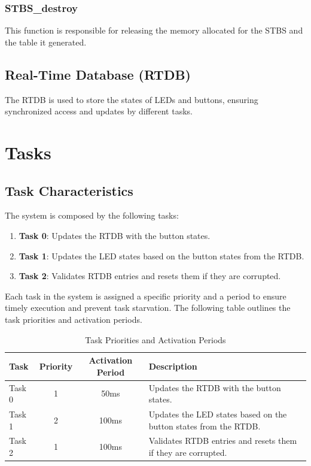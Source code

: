 \documentclass[a4paper,12pt]{article}
\begin{document}
\subsubsection{STBS\_destroy}
This function is responsible for releasing the memory allocated for the STBS and the table it generated.

\subsection{Real-Time Database (RTDB)}
The RTDB is used to store the states of LEDs and buttons, ensuring synchronized access and updates by different tasks.

\section{Tasks}
\subsection{Task Characteristics}
The system is composed by the following tasks:
\begin{enumerate}
    \item \textbf{Task 0}: Updates the RTDB with the button states.
    \item \textbf{Task 1}: Updates the LED states based on the button states from the RTDB.
    \item \textbf{Task 2}: Validates RTDB entries and resets them if they are corrupted.
\end{enumerate}

Each task in the system is assigned a specific priority and a period to ensure timely execution and prevent task starvation. The following table outlines the task priorities and activation periods.

\begin{table}[H]
    \centering
    \begin{tabular}{|l|c|c|p{5cm}|}
        \hline
        \textbf{Task} & \textbf{Priority} & \textbf{Activation Period} & \textbf{Description} \\
        \hline
        Task 0 & 1 & 50ms & Updates the RTDB with the button states. \\
        \hline
        Task 1 & 2 & 100ms & Updates the LED states based on the button states from the RTDB. \\
        \hline
        Task 2 & 1 & 100ms & Validates RTDB entries and resets them if they are corrupted. \\
        \hline
    \end{tabular}
    \caption{Task Priorities and Activation Periods}
    \label{tab:task_priorities}
\end{table}
\end{document}
